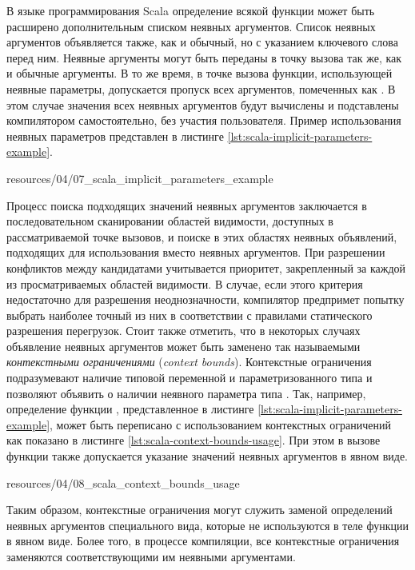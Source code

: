 В языке программирования Scala определение всякой функции может быть расширено дополнительным списком неявных аргументов. Список неявных аргументов объявляется также, как и обычный, но с указанием ключевого слова  перед ним. Неявные аргументы могут быть переданы в точку вызова так же, как и обычные аргументы. В то же время, в точке вызова функции, использующей неявные параметры, допускается пропуск всех аргументов, помеченных как . В этом случае значения всех неявных аргументов будут вычислены и подставлены компилятором самостоятельно, без участия пользователя. Пример использования неявных параметров представлен в листинге \ref{lst:scala-implicit-parameters-example}. 


{resources/04/07_scala_implicit_parameters_example}

Процесс поиска подходящих значений неявных аргументов заключается в последовательном сканировании областей видимости, доступных в рассматриваемой точке вызовов, и поиске в этих областях неявных объявлений, подходящих для использования вместо неявных аргументов. При разрешении конфликтов между кандидатами учитывается приоритет, закрепленный за каждой из просматриваемых областей видимости. В случае, если этого критерия недостаточно для разрешения неоднозначности, компилятор предпримет попытку выбрать наиболее точный из них в соответствии с правилами статического разрешения перегрузок. Стоит также отметить, что в некоторых случаях объявление неявных аргументов может быть заменено так называемыми \emph{контекстными ограничениями} (\emph{context bounds}). Контекстные ограничения подразумевают наличие типовой переменной  и параметризованного типа  и позволяют объявить о наличии неявного параметра типа . Так, например, определение функции , представленное в листинге \ref{lst:scala-implicit-parameters-example}, может быть переписано с использованием контекстных ограничений как показано в листинге \ref{lst:scala-context-bounds-usage}. При этом в вызове функции  также допускается указание значений неявных аргументов в явном виде. 


{resources/04/08_scala_context_bounds_usage}

Таким образом, контекстные ограничения могут служить заменой определений неявных аргументов специального вида, которые не используются в теле функции в явном виде. Более того, в процессе компиляции, все контекстные ограничения заменяются соответствующими им неявными аргументами.  

